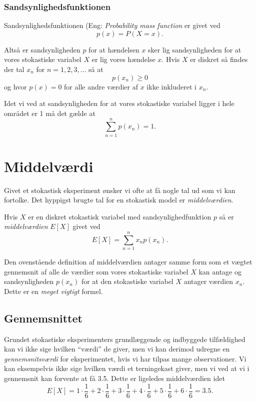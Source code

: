 \subsubsection{Sandsynlighedsfunktionen}
\begin{sæt}[sandsynlighedsfunktionen]
  Sandsynlighedsfunktionen (Eng: \textit{Probability mass function} er givet ved
  \[ 
  p(x) = P(X = x)
  .\]
\end{sæt}

Altså er sandsynligheden $p$ for at hændelsen $x$ sker lig sandsynligheden for at vores stokastiske variabel $X$ er lig vores hændelse $x$. Hvis $X$ er diskret så findes der tal $x_n$ for $n = 1,2,3,\ldots$ så at
  \[ 
  p(x_n) \geq 0
  \]
og hvor $p(x) = 0$ for alle andre værdier af $x$ ikke inkluderet i $x_n$. 

\begin{sæt}
    Idet vi ved at sandsynligheden for at vores stokastiske variabel ligger i hele området er 1 må det gælde at
  \[ 
  \sum_{n = 1}^{n} p(x_n) = 1
  .\]
\end{sæt}

\section{Middelværdi}
Givet et stokastisk eksperiment ønsker vi ofte at få nogle tal ud som vi kan fortolke. Det hyppigst brugte tal for en stokastisk model er \textit{middelværdien}.

\begin{definition}[Middelværdien]
  Hvis $X$ er en diskret stokastisk variabel med sandsynlighedfunktion $p$ så er \textit{middelværdien} $E[X]$ givet ved
  \[ 
    E[X] = \sum_{n = 1}^{n} x_n p(x_n)
  .\]
\end{definition}

Den ovenstående definition af middelværdien antager samme form som et vægtet gennemsnit af alle de værdier som vores stokastiske variabel $X$ kan antage og sandsynligheden $p(x_n)$ for at den stokastiske variabel $X$ antager værdien $x_n$. Dette er en \textit{meget vigtigt} formel.

\subsection{Gennemsnittet}
Grundet stokastiske eksperimenters grundlæggende og indbyggede tilfældighed kan vi ikke sige hvilken ``værdi'' de giver, men vi kan derimod udregne en \textit{gennemsnitsværdi} for eksperimentet, hvis vi har tilpas mange observationer. Vi kan eksempelvis ikke sige hvilken værdi et terningekast giver, men vi ved at vi i gennemsnit kan forvente at få \num{3,5}. Dette er ligeledes middelværdien idet
\[ 
  E[X] = 1 \cdot \frac{1}{6} + 2\cdot \frac{1}{6} + 3 \cdot \frac{1}{6} + 4 \cdot \frac{1}{6} + 5\cdot \frac{1}{6} + 6 \cdot \frac{1}{6} = \num{3,5} 
.\]

